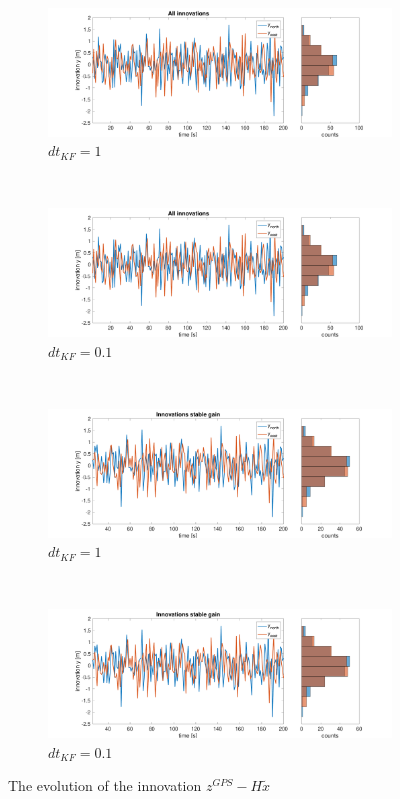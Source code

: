 \documentclass{article}
\begin{document}
\begin{figure}[H]
    \begin{subfigure}[t]{0.49\textwidth}
        \centering
        \includegraphics[width=\textwidth]{dt1/innovation_all}
        \caption{$dt_{KF} = 1$}
    \end{subfigure}
    ~
    \begin{subfigure}[t]{0.49\textwidth}
        \centering
        \includegraphics[width=\textwidth]{dt01/innovation_all}
        \caption{$dt_{KF} = 0.1$}
    \end{subfigure}
    ~
    \begin{subfigure}[t]{0.49\textwidth}
        \centering
        \includegraphics[width=\textwidth]{dt1/innovation_stable}
        \caption{$dt_{KF} = 1$}
    \end{subfigure}
    ~
    \begin{subfigure}[t]{0.49\textwidth}
        \centering
        \includegraphics[width=\textwidth]{dt01/innovation_stable}
        \caption{$dt_{KF} = 0.1$}
    \end{subfigure}
    \caption{The evolution of the innovation $z^{GPS} - H\tilde x$}
    \label{fig:traj_motion_noise}
\end{figure}
\end{document}
